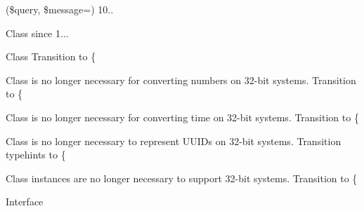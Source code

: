 \begin{DoxyRefList}
\item[\doxylink{report_8contract_8php_a77b973d137fb33212e018b042df6e3e7}{Global(e)} \doxylink{class_d_bmysql_aa94454ef6b04d177f048a7031147f659}{DBmysql\+::query\+Or\+Die} (\$query, \$message=\textquotesingle{}\textquotesingle{})]\label{deprecated__deprecated000005}%
%
10..  
\item[Class \doxylink{class_scss_php_1_1_scss_php_1_1_formatter_1_1_debug}{Debug} ]\label{deprecated__deprecated000205}%
%
since 1... 
\item[Class \doxylink{class_ramsey_1_1_uuid_1_1_builder_1_1_default_uuid_builder}{Default\+Uuid\+Builder} ]\label{deprecated__deprecated000106}%
%
Transition to \{ 
\item[Class \doxylink{class_ramsey_1_1_uuid_1_1_converter_1_1_number_1_1_degraded_number_converter}{Degraded\+Number\+Converter} ]\label{deprecated__deprecated000109}%
%
 is no longer necessary for converting numbers on 32-\/bit systems. Transition to \{ 
\item[Class \doxylink{class_ramsey_1_1_uuid_1_1_converter_1_1_time_1_1_degraded_time_converter}{Degraded\+Time\+Converter} ]\label{deprecated__deprecated000111}%
%
 is no longer necessary for converting time on 32-\/bit systems. Transition to \{ 
\item[Class \doxylink{class_ramsey_1_1_uuid_1_1_degraded_uuid}{Degraded\+Uuid} ]\label{deprecated__deprecated000112}%
%
 is no longer necessary to represent UUIDs on 32-\/bit systems. Transition typehints to \{ 
\item[Class \doxylink{class_ramsey_1_1_uuid_1_1_builder_1_1_degraded_uuid_builder}{Degraded\+Uuid\+Builder} ]\label{deprecated__deprecated000107}%
%
 instances are no longer necessary to support 32-\/bit systems. Transition to \{ 
\item[Interface \doxylink{interface_laminas_1_1_service_manager_1_1_delegator_factory_interface}{Delegator\+Factory\+Interface} ]\label{deprecated__deprecated000076}%

\end{DoxyRefList}
